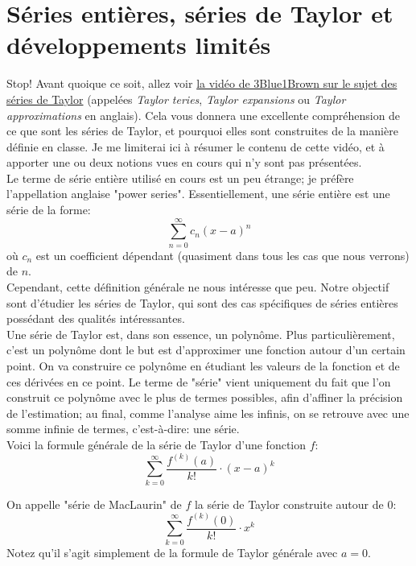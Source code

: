 \documentclass{article}
\begin{document}
\section{Séries entières, séries de Taylor et développements limités}
Stop! Avant quoique ce soit, allez voir \href{https://www.youtube.com/watch?v=3d6DsjIBzJ4}{la vidéo de 3Blue1Brown sur le sujet des séries de Taylor} (appelées \emph{Taylor teries}, \emph{Taylor expansions} ou \emph{Taylor approximations} en anglais). Cela vous donnera une excellente compréhension de ce que sont les séries de Taylor, et pourquoi elles sont construites de la manière définie en classe. Je me limiterai ici à résumer le contenu de cette vidéo, et à apporter une ou deux notions vues en cours qui n'y sont pas présentées. \\

Le terme de série entière utilisé en cours est un peu étrange; je préfère l'appellation anglaise "power series". Essentiellement, une série entière est une série de la forme:
\begin{equation*}
	\sum_{n = 0}^\infty c_n (x-a)^n
\end{equation*}
où \(c_n\) est un coefficient dépendant (quasiment dans tous les cas que nous verrons) de \(n\). \\
Cependant, cette définition générale ne nous intéresse que peu. Notre objectif sont d'étudier les séries de Taylor, qui sont des cas spécifiques de séries entières possédant des qualités intéressantes. \\

Une série de Taylor est, dans son essence, un polynôme. Plus particulièrement, c'est un polynôme dont le but est d'approximer une fonction autour d'un certain point. On va construire ce polynôme en étudiant les valeurs de la fonction et de ces dérivées en ce point. Le terme de "série" vient uniquement du fait que l'on construit ce polynôme avec le plus de termes possibles, afin d'affiner la précision de l'estimation; au final, comme l'analyse aime les infinis, on se retrouve avec une somme infinie de termes, c'est-à-dire: une série. \\

Voici la formule générale de la série de Taylor d'une fonction \(f\):
\begin{equation}
	\boxed{ \sum_{k=0}^\infty \dfrac{f^{(k)}(a)}{k!} \cdot (x-a)^k }
\end{equation}

On appelle "série de MacLaurin" de \(f\) la série de Taylor construite autour de 0:
\begin{equation}
	\boxed{ \sum_{k=0}^\infty \dfrac{f^{(k)}(0)}{k!} \cdot x^k }
\end{equation}
Notez qu'il s'agit simplement de la formule de Taylor générale avec \(a = 0\).
\end{document}
